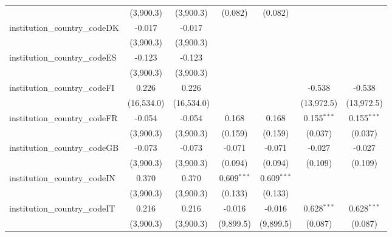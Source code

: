 \begin{tabular}{lcccccc}
                                         & (3,900.3)      & (3,900.3)      & (0.082)       & (0.082)       &                &   \\   
   institution\_country\_codeDK          & -0.017         & -0.017         &               &               &                &   \\   
                                         & (3,900.3)      & (3,900.3)      &               &               &                &   \\   
   institution\_country\_codeES          & -0.123         & -0.123         &               &               &                &   \\   
                                         & (3,900.3)      & (3,900.3)      &               &               &                &   \\   
   institution\_country\_codeFI          & 0.226          & 0.226          &               &               & -0.538         & -0.538\\   
                                         & (16,534.0)     & (16,534.0)     &               &               & (13,972.5)     & (13,972.5)\\   
   institution\_country\_codeFR          & -0.054         & -0.054         & 0.168         & 0.168         & 0.155$^{***}$  & 0.155$^{***}$\\   
                                         & (3,900.3)      & (3,900.3)      & (0.159)       & (0.159)       & (0.037)        & (0.037)\\   
   institution\_country\_codeGB          & -0.073         & -0.073         & -0.071        & -0.071        & -0.027         & -0.027\\   
                                         & (3,900.3)      & (3,900.3)      & (0.094)       & (0.094)       & (0.109)        & (0.109)\\   
   institution\_country\_codeIN          & 0.370          & 0.370          & 0.609$^{***}$ & 0.609$^{***}$ &                &   \\   
                                         & (3,900.3)      & (3,900.3)      & (0.133)       & (0.133)       &                &   \\   
   institution\_country\_codeIT          & 0.216          & 0.216          & -0.016        & -0.016        & 0.628$^{***}$  & 0.628$^{***}$\\   
                                         & (3,900.3)      & (3,900.3)      & (9,899.5)     & (9,899.5)     & (0.087)        & (0.087)\\   

\end{tabular}
